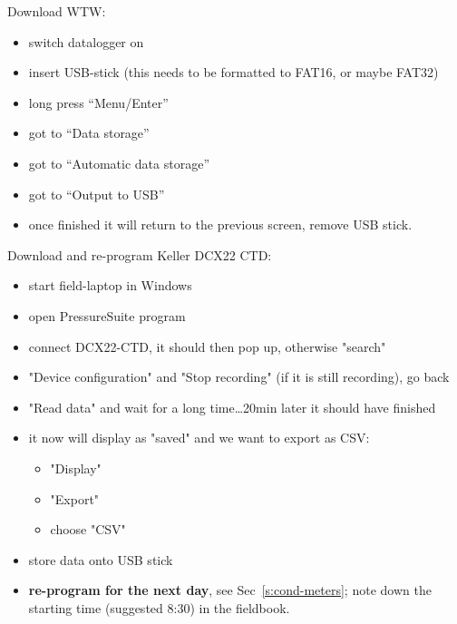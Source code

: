 \documentclass[DIV=15,halfparskip,11pt,headinclude]{scrartcl}
\begin{document}
Download WTW:
\begin{itemize}
\item switch datalogger on
\item insert USB-stick (this needs to be formatted to FAT16, or maybe FAT32)
\item long press ``Menu/Enter''
\item got to ``Data storage''
\item got to ``Automatic data storage''
\item got to ``Output to USB''
\item once finished it will return to the previous screen, remove USB
  stick.
\end{itemize}

Download and re-program Keller DCX22 CTD:
\begin{itemize}
\item start field-laptop in Windows
\item open PressureSuite program
\item connect DCX22-CTD, it should then pop up, otherwise "search"
\item "Device configuration" and "Stop recording" (if it is still recording), go back
\item "Read data" and wait for a long time\ldots 20min later it should have finished
\item it now will display as "saved" and we want to export as CSV:
\begin{itemize}
\item "Display"
\item "Export"
\item choose "CSV"
\end{itemize}
\item store data onto USB stick
\item \textbf{re-program for the next day}, see Sec~\ref{s:cond-meters}; note
  down the starting time (suggested 8:30) in the fieldbook.
\end{itemize}
\end{document}
